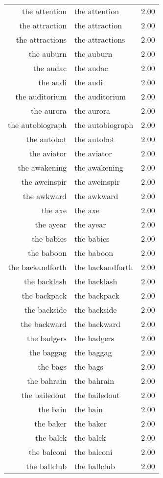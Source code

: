 \begin{table}[ht]
\begin{tabular}{rlr}
  the attention & the attention & 2.00 \\ 
  the attraction & the attraction & 2.00 \\ 
  the attractions & the attractions & 2.00 \\ 
  the auburn & the auburn & 2.00 \\ 
  the audac & the audac & 2.00 \\ 
  the audi & the audi & 2.00 \\ 
  the auditorium & the auditorium & 2.00 \\ 
  the aurora & the aurora & 2.00 \\ 
  the autobiograph & the autobiograph & 2.00 \\ 
  the autobot & the autobot & 2.00 \\ 
  the aviator & the aviator & 2.00 \\ 
  the awakening & the awakening & 2.00 \\ 
  the aweinspir & the aweinspir & 2.00 \\ 
  the awkward & the awkward & 2.00 \\ 
  the axe & the axe & 2.00 \\ 
  the ayear & the ayear & 2.00 \\ 
  the babies & the babies & 2.00 \\ 
  the baboon & the baboon & 2.00 \\ 
  the backandforth & the backandforth & 2.00 \\ 
  the backlash & the backlash & 2.00 \\ 
  the backpack & the backpack & 2.00 \\ 
  the backside & the backside & 2.00 \\ 
  the backward & the backward & 2.00 \\ 
  the badgers & the badgers & 2.00 \\ 
  the baggag & the baggag & 2.00 \\ 
  the bags & the bags & 2.00 \\ 
  the bahrain & the bahrain & 2.00 \\ 
  the bailedout & the bailedout & 2.00 \\ 
  the bain & the bain & 2.00 \\ 
  the baker & the baker & 2.00 \\ 
  the balck & the balck & 2.00 \\ 
  the balconi & the balconi & 2.00 \\ 
  the ballclub & the ballclub & 2.00 \\ 

\end{tabular}
\end{table}

